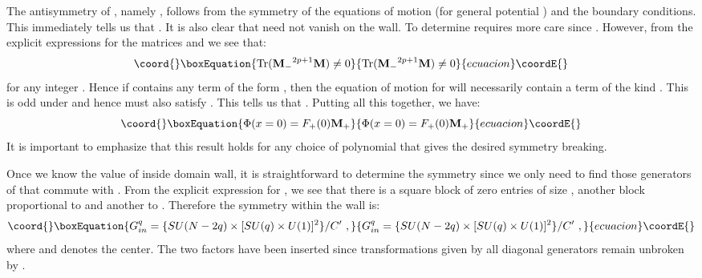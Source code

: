 \documentclass[a4paper,prd,nofootinbib,twocolumn,showpacs]{revtex4}
\begin{document}
The antisymmetry of \coordHE{}, namely \coordHE{},
follows from the symmetry of the equations of motion (for
general potential \coordHE{}) and the boundary conditions.
This immediately tells us that \coordHE{}. It is also
clear that \coordHE{} need not vanish on the wall. To determine
\coordHE{} requires more care since \coordHE{}.
However, from the explicit expressions for the matrices
\coordHE{} and \coordHE{} we see that:
\begin{equation}\coord{}\boxEquation{
{\rm Tr}( {\bf M_-}^{2p+1} {\bf M} ) \ne 0
\label{M+M}
}{
{\rm Tr}( {\bf M_-}^{2p+1} {\bf M} ) \ne 0
}{ecuacion}\coordE{}\end{equation}
for any integer \coordHE{}. Hence if \coordHE{} contains 
any term of the form \coordHE{}, then the equation of
motion for \coordHE{} will necessarily contain a term of the
kind \coordHE{}. This is odd under \coordHE{}
and hence \coordHE{} must also satisfy \coordHE{}. This
tells us that \coordHE{}. Putting all this together, we
have:
\begin{equation}\coord{}\boxEquation{
\Phi (x=0) = F_+ (0) {\bf M}_+
\label{Phiatx=0}
}{
\Phi (x=0) = F_+ (0) {\bf M}_+
}{ecuacion}\coordE{}\end{equation}
It is important to emphasize that this result holds for 
any choice of polynomial \coordHE{} that gives the desired 
symmetry breaking.

Once we know the value of \myHighlight{$\Phi$}\coordHE{} inside domain wall, it is
straightforward to determine the symmetry since we only need
to find those generators of \coordHE{} that commute with
\coordHE{}. From the explicit expression for \coordHE{},
we see that there is a square block of zero entries of
size \coordHE{}, another block proportional to
\coordHE{} and another to \coordHE{}. Therefore
the symmetry within the wall is:
\begin{equation}\coord{}\boxEquation{
G_{in}^q = \{ SU(N-2q)\times [SU(q)\times U(1)]^2 \} /C' \ , 
\label{Ginside}
}{
G_{in}^q = \{ SU(N-2q)\times [SU(q)\times U(1)]^2 \} /C' \ , 
}{ecuacion}\coordE{}\end{equation}
where \coordHE{} and
\coordHE{} denotes the center. The two \coordHE{} factors
have been inserted since transformations given by all 
diagonal generators remain unbroken by \coordHE{}.
\end{document}
